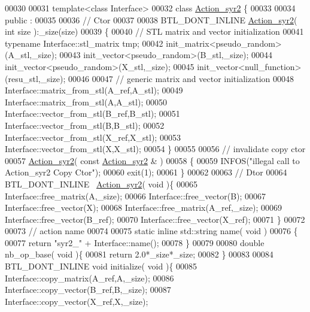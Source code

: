 \begin{DoxyCode}
00030 
00031 \textcolor{keyword}{template}<\textcolor{keyword}{class} Interface>
00032 \textcolor{keyword}{class }\hyperlink{class_action__syr2}{Action\_syr2} \{
00033 
00034 public :
00035 
00036   \textcolor{comment}{// Ctor}
00037 
00038   BTL\_DONT\_INLINE \hyperlink{class_action__syr2}{Action\_syr2}( \textcolor{keywordtype}{int} size ):\_size(size)
00039   \{
00040     \textcolor{comment}{// STL matrix and vector initialization}
00041     \textcolor{keyword}{typename} Interface::stl\_matrix tmp;
00042     init\_matrix<pseudo\_random>(A\_stl,\_size);
00043     init\_vector<pseudo\_random>(B\_stl,\_size);
00044     init\_vector<pseudo\_random>(X\_stl,\_size);
00045     init\_vector<null\_function>(resu\_stl,\_size);
00046 
00047     \textcolor{comment}{// generic matrix and vector initialization}
00048     Interface::matrix\_from\_stl(A\_ref,A\_stl);
00049     Interface::matrix\_from\_stl(A,A\_stl);
00050     Interface::vector\_from\_stl(B\_ref,B\_stl);
00051     Interface::vector\_from\_stl(B,B\_stl);
00052     Interface::vector\_from\_stl(X\_ref,X\_stl);
00053     Interface::vector\_from\_stl(X,X\_stl);
00054   \}
00055 
00056   \textcolor{comment}{// invalidate copy ctor}
00057   \hyperlink{class_action__syr2}{Action\_syr2}( \textcolor{keyword}{const}  \hyperlink{class_action__syr2}{Action\_syr2} & )
00058   \{
00059     INFOS(\textcolor{stringliteral}{"illegal call to Action\_syr2 Copy Ctor"});
00060     exit(1);
00061   \}
00062 
00063   \textcolor{comment}{// Dtor}
00064   BTL\_DONT\_INLINE ~\hyperlink{class_action__syr2}{Action\_syr2}( \textcolor{keywordtype}{void} )\{
00065     Interface::free\_matrix(A,\_size);
00066     Interface::free\_vector(B);
00067     Interface::free\_vector(X);
00068     Interface::free\_matrix(A\_ref,\_size);
00069     Interface::free\_vector(B\_ref);
00070     Interface::free\_vector(X\_ref);
00071   \}
00072 
00073   \textcolor{comment}{// action name}
00074 
00075   \textcolor{keyword}{static} \textcolor{keyword}{inline} std::string name( \textcolor{keywordtype}{void} )
00076   \{
00077     \textcolor{keywordflow}{return} \textcolor{stringliteral}{"syr2\_"} + Interface::name();
00078   \}
00079 
00080   \textcolor{keywordtype}{double} nb\_op\_base( \textcolor{keywordtype}{void} )\{
00081     \textcolor{keywordflow}{return} 2.0*\_size*\_size;
00082   \}
00083 
00084   BTL\_DONT\_INLINE  \textcolor{keywordtype}{void} initialize( \textcolor{keywordtype}{void} )\{
00085     Interface::copy\_matrix(A\_ref,A,\_size);
00086     Interface::copy\_vector(B\_ref,B,\_size);
00087     Interface::copy\_vector(X\_ref,X,\_size);

\end{DoxyCode}
